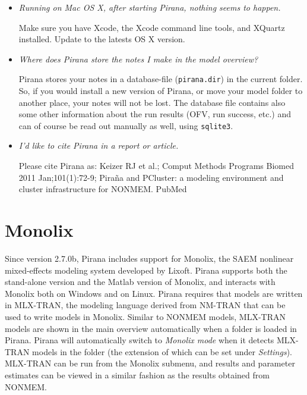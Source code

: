 {{{{\begin{itemize}
 \item \textit{Running on Mac OS X, after starting Pirana, nothing seems to happen.}

 \vspace{5pt}
 Make sure you have Xcode, the Xcode command line tools, and XQuartz installed. Update to the latests OS X version. 

 \item \textit{Where does Pirana store the notes I make in the model overview?}

\vspace{5pt} Pirana stores your notes in a database-file ({\tt pirana.dir}) in the current folder. So, if you would install a new version of Pirana, or move your model folder to another place, your notes will not be lost. The database file contains also some other information about the run results (OFV, run success, etc.) and can of course be read out manually as well, using {\tt sqlite3}.

\item \textit{I'd like to cite Pirana in a report or article.}

\vspace{5pt} Please cite Pirana as: Keizer RJ et al.; Comput Methods Programs Biomed 2011 Jan;101(1):72-9; Pira\~na and PCluster: a modeling environment and cluster infrastructure for NONMEM. PubMed

\end{itemize}


\clearpage
\section{Monolix}
Since version 2.7.0b, Pirana includes support for Monolix, the SAEM nonlinear mixed-effects modeling
system developed by Lixoft. Pirana supports both the stand-alone version and the Matlab version of Monolix,
and interacts with Monolix both on Windows and on Linux. Pirana requires that models are 
written in MLX-TRAN, the modeling language derived from NM-TRAN that can be used to write models in 
Monolix. Similar to NONMEM models, MLX-TRAN models are shown in the main overview automatically when
a folder is loaded in Pirana. Pirana will automatically switch to \textit{Monolix mode} when it detects
MLX-TRAN models in the folder (the extension of which can be set under \textit{Settings}). MLX-TRAN can be run from the Monolix submenu, 
and results and parameter estimates can be viewed in a similar fashion as the results obtained from NONMEM.

}}}}
